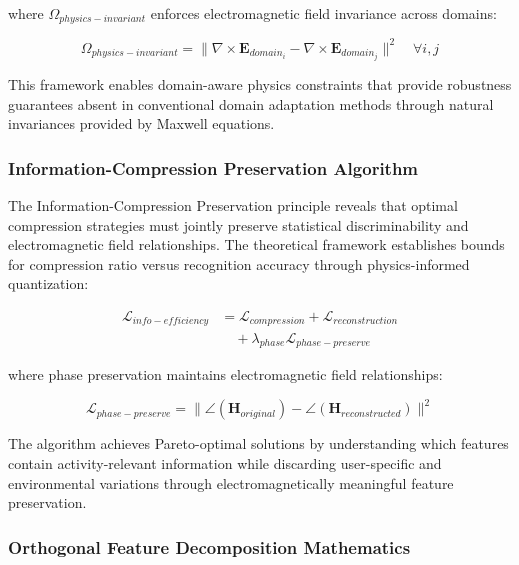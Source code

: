 \documentclass[journal]{IEEEtran}
\begin{document}
where $\Omega_{physics-invariant}$ enforces electromagnetic field invariance across domains:

\begin{equation}
\Omega_{physics-invariant} = \|\nabla \times \mathbf{E}_{domain_i} - \nabla \times \mathbf{E}_{domain_j}\|^2 \quad \forall i,j
\label{eq:physics_invariance}
\end{equation}

This framework enables domain-aware physics constraints that provide robustness guarantees absent in conventional domain adaptation methods through natural invariances provided by Maxwell equations.

\subsubsection{Information-Compression Preservation Algorithm}

The Information-Compression Preservation principle reveals that optimal compression strategies must jointly preserve statistical discriminability and electromagnetic field relationships. The theoretical framework establishes bounds for compression ratio versus recognition accuracy through physics-informed quantization:

\begin{align}
\mathcal{L}_{info-efficiency} &= \mathcal{L}_{compression} + \mathcal{L}_{reconstruction} \nonumber \\
&\quad + \lambda_{phase} \mathcal{L}_{phase-preserve} \label{eq:info_efficiency_cluster}
\end{align}

where phase preservation maintains electromagnetic field relationships:

\begin{equation}
\mathcal{L}_{phase-preserve} = \|\angle(\mathbf{H}_{original}) - \angle(\mathbf{H}_{reconstructed})\|^2
\label{eq:phase_preservation}
\end{equation}

The algorithm achieves Pareto-optimal solutions by understanding which features contain activity-relevant information while discarding user-specific and environmental variations through electromagnetically meaningful feature preservation.

\subsubsection{Orthogonal Feature Decomposition Mathematics}
\end{document}
